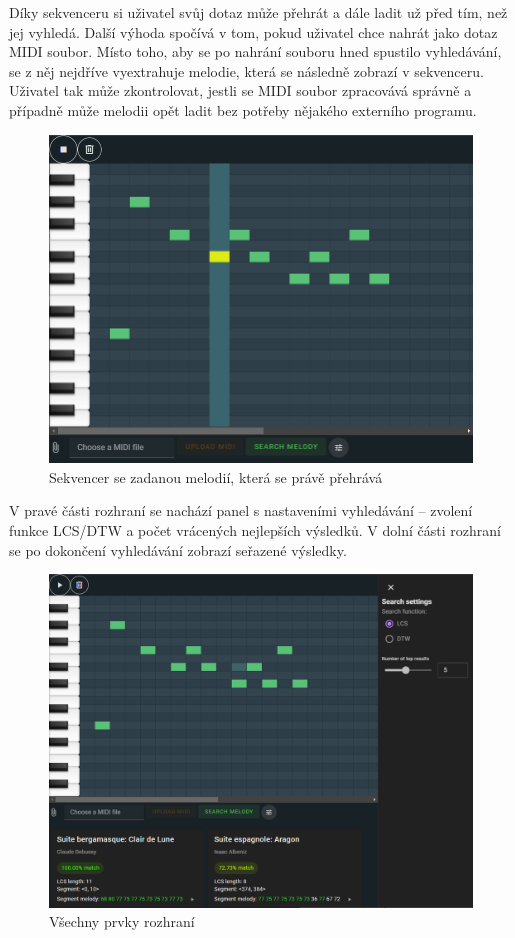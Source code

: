 Díky sekvenceru si uživatel svůj dotaz může přehrát a dále ladit už před tím, než jej vyhledá. Další výhoda spočívá v tom, pokud uživatel chce nahrát jako dotaz MIDI soubor. Místo toho, aby se po nahrání souboru hned spustilo vyhledávání, se z něj nejdříve vyextrahuje melodie, která se následně zobrazí v sekvenceru. Uživatel tak může zkontrolovat, jestli se MIDI soubor zpracovává správně a případně může melodii opět ladit bez potřeby nějakého externího programu.

\begin{figure}[!ht]
    \centering
    \caption{Sekvencer se zadanou melodií, která se právě přehrává}
    \includegraphics[width=\textwidth]{images/seq_playing.png}
\end{figure}

V pravé části rozhraní se nachází panel s nastaveními vyhledávání -- zvolení funkce LCS/DTW a počet vrácených nejlepších výsledků. V dolní části rozhraní se po dokončení vyhledávání zobrazí seřazené výsledky.

\begin{figure}
    \centering
    \caption{Všechny prvky rozhraní}
    \includegraphics[width=\textwidth]{images/interface.png}
\end{figure}
\pagebreak